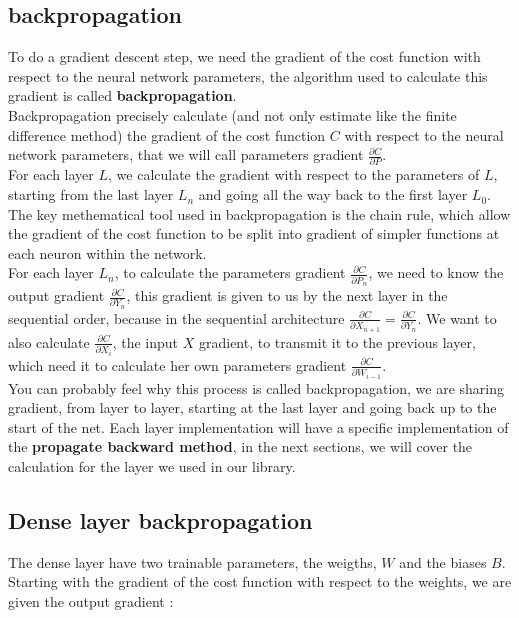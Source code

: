 \documentclass[a4paper, twocolumn, twoside]{article}
\begin{document}
	\subsection{backpropagation}
	To do a gradient descent step, we need the gradient of
	the cost function with respect to the neural network parameters,
	the algorithm used to calculate this gradient 
	is called \textbf{backpropagation}.\\
	Backpropagation precisely calculate
	(and not only estimate like the finite difference method) the gradient of the cost function $C$ with respect to the neural network parameters,
	that we will call parameters gradient $\frac{\partial C}{\partial P}$.\\
	For each layer $L$, we calculate the gradient with respect to the parameters of $L$,
	starting from the last layer $L_n$ and going all the way back to the first layer $L_0$.\\
	The key methematical tool used in backpropagation is the chain rule,
	which allow the gradient of the cost function
	to be split into gradient of simpler functions at each neuron within the network.\\
	For each layer $L_n$, to calculate the parameters gradient $\frac{\partial C}{\partial P_n}$,
	we need to know the output gradient $\frac{\partial C}{\partial Y_n}$, this gradient is given to us by the next layer in the sequential order,
	because in the sequential architecture $\frac{\partial C}{\partial X_{n+1}} = \frac{\partial C}{\partial Y_n}$.
	We want to also calculate $\frac{\partial C}{\partial X_i}$, the input $X$ gradient,
	to transmit it to the previous layer, which need it to calculate her own parameters gradient $\frac{\partial C}{\partial W_{i-1}}$.\\
	You can probably feel why this process is called backpropagation, we are sharing gradient,
	from layer to layer, starting at the last layer and going back up to the start of the net.
	Each layer implementation will have a specific implementation of the \textbf{propagate backward method},
	in the next sections, we will cover the calculation for the layer we used in our library.

	\subsection{Dense layer backpropagation}

	The dense layer have two trainable parameters, the weigths, $W$ and the biases $B$.
	Starting with the gradient of the cost function with respect to the weights, we are given
	the output gradient :
\end{document}

